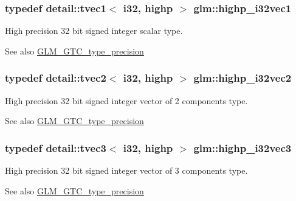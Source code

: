 \subsubsection[{\texorpdfstring{highp\+\_\+i32vec1}{highp_i32vec1}}]{\setlength{\rightskip}{0pt plus 5cm}typedef detail\+::tvec1$<$ i32, highp $>$ {\bf glm\+::highp\+\_\+i32vec1}}\hypertarget{group__gtc__type__precision_gadcd58130a48fa561e784a135a88c5d6e}{}\label{group__gtc__type__precision_gadcd58130a48fa561e784a135a88c5d6e}
High precision 32 bit signed integer scalar type. \begin{DoxySeeAlso}{See also}
\hyperlink{group__gtc__type__precision}{G\+L\+M\+\_\+\+G\+T\+C\+\_\+type\+\_\+precision} 
\end{DoxySeeAlso}
\subsubsection[{\texorpdfstring{highp\+\_\+i32vec2}{highp_i32vec2}}]{\setlength{\rightskip}{0pt plus 5cm}typedef detail\+::tvec2$<$ i32, highp $>$ {\bf glm\+::highp\+\_\+i32vec2}}\hypertarget{group__gtc__type__precision_ga6020d795076243085eb0d6826c849b4a}{}\label{group__gtc__type__precision_ga6020d795076243085eb0d6826c849b4a}
High precision 32 bit signed integer vector of 2 components type. \begin{DoxySeeAlso}{See also}
\hyperlink{group__gtc__type__precision}{G\+L\+M\+\_\+\+G\+T\+C\+\_\+type\+\_\+precision} 
\end{DoxySeeAlso}
\subsubsection[{\texorpdfstring{highp\+\_\+i32vec3}{highp_i32vec3}}]{\setlength{\rightskip}{0pt plus 5cm}typedef detail\+::tvec3$<$ i32, highp $>$ {\bf glm\+::highp\+\_\+i32vec3}}\hypertarget{group__gtc__type__precision_ga95de80f73e676fb6b9976ff0d33bbc4b}{}\label{group__gtc__type__precision_ga95de80f73e676fb6b9976ff0d33bbc4b}
High precision 32 bit signed integer vector of 3 components type. \begin{DoxySeeAlso}{See also}
\hyperlink{group__gtc__type__precision}{G\+L\+M\+\_\+\+G\+T\+C\+\_\+type\+\_\+precision} 
\end{DoxySeeAlso}
